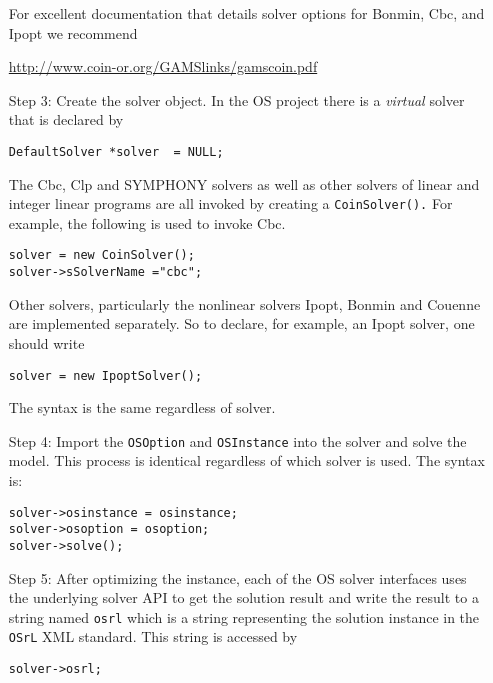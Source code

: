 \documentclass[11pt]{article}
\renewcommand{\_}{{\char"5F}}
\renewcommand{\{}{{\char"7B}}
\renewcommand{\}}{{\char"7D}}
\renewcommand{\^}{{\char"0D}}
\renewcommand{\'}{{\char"0D}}
\begin{document}
\begin{itemize}
For excellent documentation that details solver options for Bonmin, Cbc, and Ipopt  we recommend 

\begin{center}
\url{http://www.coin-or.org/GAMSlinks/gamscoin.pdf}
\end{center}


\item[Step 3:] Create the solver object. In the OS project there is a {\it virtual} solver that 
is declared by

\begin{verbatim}
DefaultSolver *solver  = NULL;
\end{verbatim}

The Cbc, Clp and SYMPHONY solvers as well as other solvers of linear and integer linear programs
are all invoked by creating a {\tt CoinSolver().} For example, the following is used to invoke Cbc.

\begin{verbatim}
solver = new CoinSolver();
solver->sSolverName ="cbc";
\end{verbatim}

Other solvers, particularly the nonlinear solvers Ipopt, Bonmin and Couenne are implemented separately. 
So to declare, for example, an Ipopt solver, one should write

\begin{verbatim}
solver = new IpoptSolver();
\end{verbatim}

The syntax is the same regardless of solver. 

\item[Step 4:] Import the {\tt OSOption} and {\tt OSInstance} into the solver and solve the model. 
This process is identical regardless of which solver is used. The syntax is:

\begin{verbatim}
solver->osinstance = osinstance;
solver->osoption = osoption;	
solver->solve();
\end{verbatim}

\item[Step 5:] After optimizing the instance,  each of the OS solver interfaces uses the underlying solver API to get the solution result and write the result to a string 
named {\tt osrl} which is a string representing the solution instance in the {\tt OSrL} XML standard.  
This string is accessed by

\begin{verbatim}
solver->osrl;
\end{verbatim}



\end{itemize}
\end{document}
